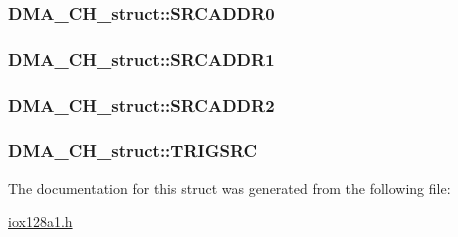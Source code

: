 \label{struct_d_m_a___c_h__struct_a9d417f7ee7ef84a295126199b616ba90}
\hypertarget{struct_d_m_a___c_h__struct_a37ff98f2715f6fbd6422e0f783ae1d58}{
\subsubsection[{SRCADDR0}]{ {\bf DMA\_\-CH\_\-struct::SRCADDR0}}}
\label{struct_d_m_a___c_h__struct_a37ff98f2715f6fbd6422e0f783ae1d58}
\hypertarget{struct_d_m_a___c_h__struct_a388a89a4391871e90de23b4b8d78d63d}{
\subsubsection[{SRCADDR1}]{ {\bf DMA\_\-CH\_\-struct::SRCADDR1}}}
\label{struct_d_m_a___c_h__struct_a388a89a4391871e90de23b4b8d78d63d}
\hypertarget{struct_d_m_a___c_h__struct_a60f5f650244ec1725a854301de4a0cae}{
\subsubsection[{SRCADDR2}]{ {\bf DMA\_\-CH\_\-struct::SRCADDR2}}}
\label{struct_d_m_a___c_h__struct_a60f5f650244ec1725a854301de4a0cae}
\hypertarget{struct_d_m_a___c_h__struct_a08fcb5f0232043235201ebde238e8e0e}{
\subsubsection[{TRIGSRC}]{ {\bf DMA\_\-CH\_\-struct::TRIGSRC}}}
\label{struct_d_m_a___c_h__struct_a08fcb5f0232043235201ebde238e8e0e}


The documentation for this struct was generated from the following file:\begin{DoxyCompactItemize}
\item 
\hyperlink{iox128a1_8h}{iox128a1.h}\end{DoxyCompactItemize}
